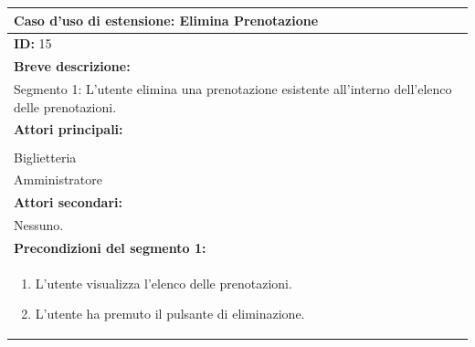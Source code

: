 \documentclass{article}
\begin{document}
                \begin{table}[H]
                    \begin{tabular}{|p{\linewidth}|}
                        \hline
                        \cellcolor{gray!100}
                        \color{white}
                        \centerline{\textbf{Caso d'uso di estensione:} Elimina Prenotazione} \\
                        \hline
                        \textbf{ID:} 15 \\
                        \hline
                        \cellcolor{gray!20}
                        \textbf{Breve descrizione:} \\
                        \cellcolor{gray!20}
                        Segmento 1: L'utente elimina una prenotazione esistente all'interno dell'elenco delle prenotazioni. \\
                        \hline
                        \textbf{Attori principali:} \\
                        \begin{minipage}{\linewidth}
                            Cliente \\
                            Biglietteria \\
                            Amministratore
                        \end{minipage}
                        \vspace{0pt} \\
                        \hline
                        \textbf{Attori secondari:} \\                        
                        Nessuno. \\
                        \hline
                        \cellcolor{gray!20}
                        \textbf{Precondizioni del segmento 1:} \\
                        \cellcolor{gray!20}
                        \begin{minipage}{\linewidth}
                            \begin{enumerate}
                                \item L'utente visualizza l'elenco delle prenotazioni.
                                \item L'utente ha premuto il pulsante di eliminazione.
                            \end{enumerate}
                        \end{minipage}

\end{tabular}
\end{table}
\end{document}
